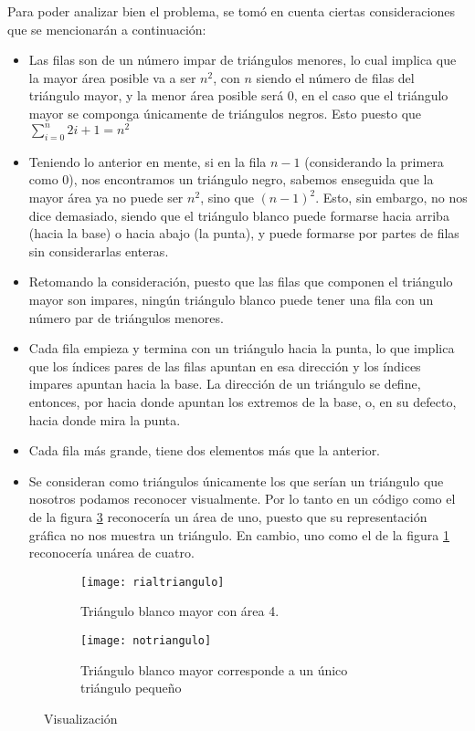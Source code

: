 \documentclass[letterpaper]{article}
\begin{document}
  Para poder analizar bien el problema, se tom\'o en cuenta ciertas
  consideraciones que se mencionar\'an a continuaci\'on:
    \begin{itemize}
    \item Las filas son de un n\'umero impar de tri\'angulos menores,
    lo cual implica que la mayor \'area posible va a ser \(n^2\), con \(n\) siendo el
    n\'umero de filas del tri\'angulo mayor, y la menor \'area posible ser\'a 0,
    en el caso que el tri\'angulo mayor se componga \'unicamente de tri\'angulos
    negros. Esto puesto que $\sum_{i=0}^{n} 2{i}+1 = {n}^2$
    \item Teniendo lo anterior en mente, si en la fila \(n-1\) (considerando la
    primera como 0), nos encontramos un tri\'angulo negro, sabemos enseguida
    que la mayor \'area ya no puede ser \({n}^2\), sino que \({(n-1)}^2\). Esto, sin embargo,
    no nos dice demasiado, siendo que el tri\'angulo blanco puede formarse hacia
    arriba (hacia la base) o hacia abajo (la punta), y puede formarse por
    partes de filas sin considerarlas enteras.
    \item Retomando la consideraci\'on, puesto que las filas que componen el
    tri\'angulo mayor son impares, ning\'un tri\'angulo blanco puede tener
    una fila con un n\'umero par de tri\'angulos menores.
    \item Cada fila empieza y termina con un tri\'angulo hacia la punta, lo que
    implica que los \'indices pares de las filas apuntan en esa direcci\'on y
    los \'indices impares apuntan hacia la base. La direcci\'on de un tri\'angulo
    se define, entonces, por hacia donde apuntan los extremos de la base, o,
    en su defecto, hacia donde mira la punta.
    \item Cada fila m\'as grande, tiene dos elementos m\'as que la
    anterior.
    \item Se consideran como tri\'angulos \'unicamente los que ser\'ian un
    tri\'angulo que nosotros podamos reconocer visualmente. Por
    lo tanto en un c\'odigo como el de la figura \ref{subfig:notriangulo} reconocer\'ia un
    \'area de uno, puesto que su representaci\'on gr\'afica no nos
    muestra un tri\'angulo. En cambio, uno como el de la figura \ref{subfig:rialtriangulo} reconocer\'ia un\'area de cuatro.
    \end{itemize}

    \begin{figure}
      \centering
      \begin{subfigure}{0.45\textwidth}
        \texttt{[image: rialtriangulo]}
        \caption{Tri\'angulo blanco mayor con \'area 4.}
        \label{subfig:rialtriangulo}
      \end{subfigure}
      \begin{subfigure}{0.45\textwidth}
        \texttt{[image: notriangulo]}
        \caption{Tri\'angulo blanco mayor corresponde a un \'unico tri\'angulo peque\~no}
        \label{subfig:notriangulo}
      \end{subfigure}
      \caption{Visualizaci\'on}
    \end{figure}
\end{document}
